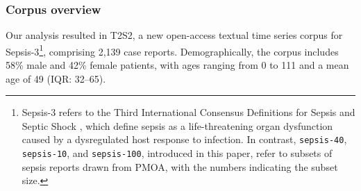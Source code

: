 \subsubsection{Corpus overview}

Our analysis resulted in T2S2, a new open-access textual time series corpus for Sepsis-3\footnote{Sepsis-3 refers to the Third International Consensus Definitions for Sepsis and Septic Shock \citep{singer2016third}, which define sepsis as a life-threatening organ dysfunction caused by a dysregulated host response to infection.
In contrast, \texttt{sepsis-40}, \texttt{sepsis-10}, and \texttt{sepsis-100}, introduced in this paper, refer to subsets of sepsis reports drawn from PMOA, with the numbers indicating the subset size.}, 
comprising 2,139 case reports.  
Demographically, the corpus includes 58\% male and 42\% female patients, with ages ranging from 0 to 111 and a mean age of 49 (IQR: 32--65).
